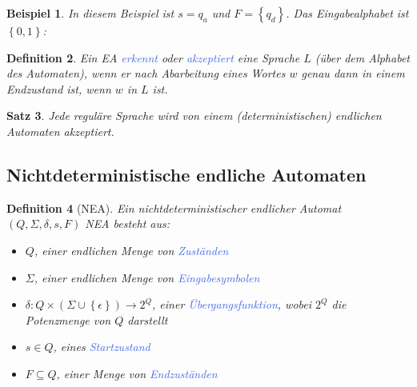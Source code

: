 \documentclass[11pt]{scrartcl}
\newcommand{\tcol}[1]{\textcolor{RoyalBlue}{#1}}
\newcommand{\set}[1]{\left\lbrace #1\right\rbrace}
\theoremstyle{break}
\newtheorem{satz}{Satz}[section]
\newtheorem{defi}[satz]{Definition}
\newtheorem{beis}[satz]{Beispiel}
\begin{document}
    \begin{beis}
        In diesem Beispiel ist $s=q_a$ und $F=\set{q_d}$.
        Das Eingabealphabet ist $\set{0,1}$:\\
        \begin{center}
        \end{center}
    \end{beis}

    \begin{defi}
        Ein EA \tcol{erkennt} oder \tcol{akzeptiert} eine Sprache $L$ (über dem Alphabet des Automaten), wenn er nach Abarbeitung eines Wortes $w$ genau dann in einem Endzustand ist, wenn $w$ in $L$ ist.
    \end{defi}

    \begin{satz}
        Jede reguläre Sprache wird von einem (deterministischen) endlichen Automaten akzeptiert.
    \end{satz}


    \subsection{Nichtdeterministische endliche Automaten}
	\label{subsec:nichtdeterministische-endliche-automaten}

    \begin{defi}[NEA]
        Ein nichtdeterministischer endlicher Automat $(Q,\Sigma ,\delta ,s,F)$ NEA besteht aus:
        \begin{itemize}
            \item $Q$, einer endlichen Menge von \tcol{Zuständen}
            \item $\Sigma$, einer endlichen Menge von \tcol{Eingabesymbolen}
            \item $\delta\colon Q\times (\Sigma\cup\set{\epsilon})\to 2^Q$, einer \tcol{Übergangsfunktion}, wobei $2^Q$ die Potenzmenge von $Q$ darstellt
            \item $s\in Q$, eines \tcol{Startzustand}
            \item $F\subseteq Q$, einer Menge von \tcol{Endzuständen}
        \end{itemize}
    \end{defi}
\end{document}
